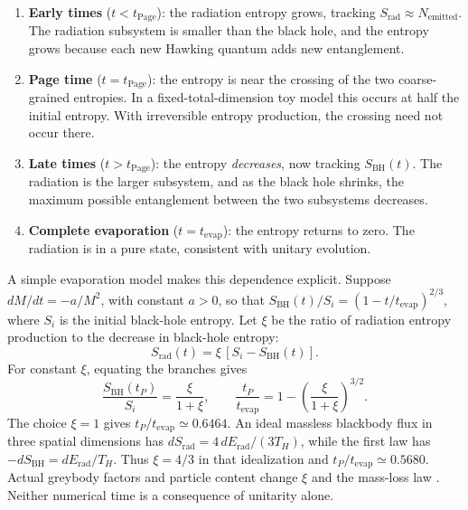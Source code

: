 \documentclass[11pt,letterpaper]{article}
\theoremstyle{plain}
\theoremstyle{definition}
\theoremstyle{remark}
\begin{document}
\begin{enumerate}
  \item \textbf{Early times} ($t < t_{\mathrm{Page}}$): the radiation
  entropy grows, tracking $S_{\mathrm{rad}} \approx N_{\mathrm{emitted}}$.
  The radiation subsystem is smaller than the black hole, and the
  entropy grows because each new Hawking quantum adds new entanglement.

  \item \textbf{Page time} ($t = t_{\mathrm{Page}}$): the entropy
  is near the crossing of the two coarse-grained entropies. In a
  fixed-total-dimension toy model this occurs at half the initial entropy.
  With irreversible entropy production, the crossing need not occur there.

  \item \textbf{Late times} ($t > t_{\mathrm{Page}}$): the entropy
  \emph{decreases}, now tracking $S_{\mathrm{BH}}(t)$.  The radiation
  is the larger subsystem, and as the black hole shrinks, the maximum
  possible entanglement between the two subsystems decreases.

  \item \textbf{Complete evaporation} ($t = t_{\mathrm{evap}}$): the
  entropy returns to zero.  The radiation is in a pure state,
  consistent with unitary evolution.
\end{enumerate}

A simple evaporation model makes this dependence explicit. Suppose
$dM/dt=-a/M^2$, with constant $a>0$, so that
$S_{\mathrm{BH}}(t)/S_i=(1-t/t_{\mathrm{evap}})^{2/3}$, where
$S_i$ is the initial black-hole entropy. Let $\xi$ be the ratio of
radiation entropy production to the decrease in black-hole entropy:
\begin{equation}
 S_{\mathrm{rad}}(t)=\xi\,[S_i-S_{\mathrm{BH}}(t)].
 \label{eq03:entropy_production}
\end{equation}
For constant $\xi$, equating the branches gives
\begin{equation}
 \frac{S_{\mathrm{BH}}(t_P)}{S_i}=\frac{\xi}{1+\xi},
 \qquad
 \frac{t_P}{t_{\mathrm{evap}}}
 =1-\left(\frac{\xi}{1+\xi}\right)^{3/2}.
 \label{eq03:page_time_xi}
\end{equation}
The choice $\xi=1$ gives $t_P/t_{\mathrm{evap}}\simeq0.6464$.
An ideal massless blackbody flux in three spatial dimensions has
$dS_{\mathrm{rad}}=4\,dE_{\mathrm{rad}}/(3T_H)$, while the first law
has $-dS_{\mathrm{BH}}=dE_{\mathrm{rad}}/T_H$. Thus $\xi=4/3$
in that idealization and $t_P/t_{\mathrm{evap}}\simeq0.5680$.
Actual greybody factors and particle content change $\xi$ and the mass-loss
law \cite{page1976}. Neither numerical time is a consequence of unitarity
alone.
\end{document}
